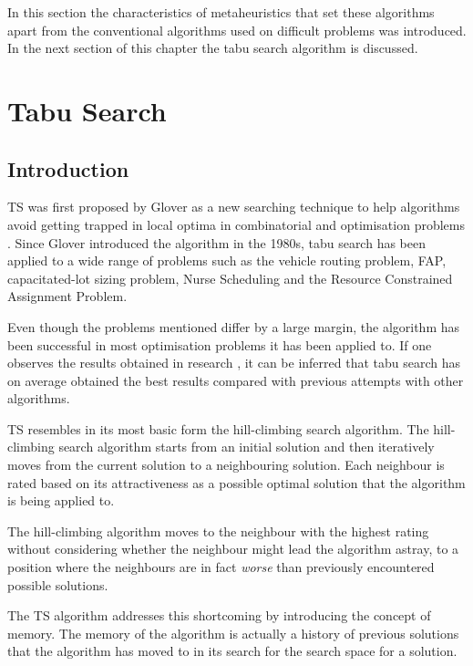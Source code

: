 In this section the characteristics of metaheuristics that set these algorithms apart from the conventional algorithms used on difficult problems was introduced. In the next section of this chapter the tabu search algorithm is discussed.
\section{Tabu Search}
\label{sec:tabusearch}
\subsection{Introduction}
\label{sec:TSIntroduction}
\gls{TS} was first proposed by Glover\cite{Glover89} as a new searching technique to help algorithms avoid getting trapped in local optima in combinatorial and optimisation problems \cite{TabuRCAProblem}. Since Glover introduced the algorithm in the 1980s, tabu search has been applied to a wide range of problems such as the vehicle routing problem\cite{TabuVechicleRoutingWithTimeWindows}, \gls{FAP}\cite{TabuMontemanniSmith}, capacitated-lot sizing problem\cite{TabuCarryOver}, Nurse Scheduling\cite{TabuNurse} and the Resource Constrained Assignment Problem\cite{TabuRCAProblem}. 

Even though the problems mentioned differ by a large margin, the algorithm has been successful in most optimisation problems it has been applied to. If one observes the results obtained in research \cite{TabuMontemanniSmith,tabuglobalplanning3g}, it can be inferred that tabu search has on average obtained the best results compared with previous attempts with other algorithms. 

\gls{TS} resembles in its most basic form the hill-climbing search algorithm\cite{TabuBiddingStrats}. The hill-climbing search algorithm starts from an initial solution and then iteratively moves from the current solution to a neighbouring solution\cite{AIModernApproach}. Each neighbour is rated based on its attractiveness as a possible optimal solution that the algorithm is being applied to\cite{AIModernApproach}. 

The hill-climbing algorithm moves to the neighbour with the highest rating without considering whether the neighbour might lead the algorithm astray, to a position where the neighbours are in fact \emph{worse} than previously encountered possible solutions\cite{AIModernApproach}. 

The \gls{TS} algorithm addresses this shortcoming by introducing the concept of memory\cite{TabuBiddingStrats}. The memory of the algorithm is actually a history of previous solutions that the algorithm has moved to in its search for the search space for a solution\cite{TabuBiddingStrats}. 

